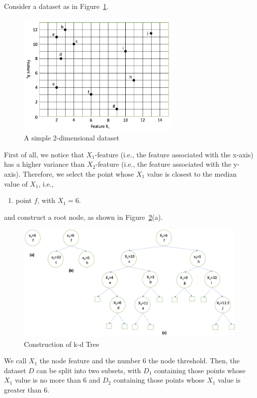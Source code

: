 \begin{example}\label{example:kdconstruction}
Consider a dataset as in Figure~\ref{fig:kd}. 
\begin{figure}[!htbp]
    \centering
    \includegraphics[width=0.7\textwidth]{images/simpleML/kd.png}
    \caption{A simple 2-dimensional dataset}
    \label{fig:kd}
\end{figure}
First of all, we notice that $X_1$-feature (i.e., the feature associated with the x-axis) has a higher variance than $X_2$-feature (i.e., the feature associated with the y-axis). Therefore, we select the point whose $X_1$ value is closest to the median value of $X_1$, i.e., 
\begin{enumerate}
    \item point $f$, with $X_1=6$.
\end{enumerate}
and construct a root node, as shown in Figure~\ref{fig:kd2}(a). 
\begin{figure}[!htbp]
    \centering
    \includegraphics[width=1.0\textwidth]{images/simpleML/kd2.png}
    \caption{Construction of k-d Tree}
    \label{fig:kd2}
\end{figure}
We call $X_1$ the node feature and the number $6$ the node threshold. 
Then, the dataset $D$ can be split into two subsets, with $D_1$ containing those points whose $X_1$ value is no more than $6$ and $D_2$ containing those points whose $X_1$ value is greater than $6$. 


\end{example}
